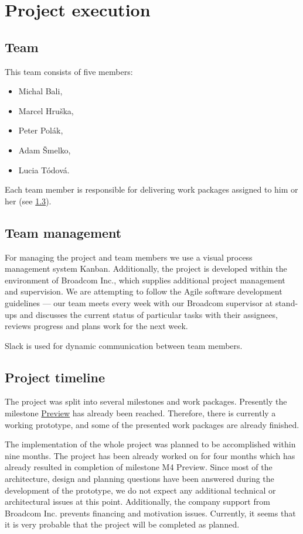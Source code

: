 \chapter{Project execution}

\section{Team}
This team consists of five members:

\begin{itemize}
	\item Michal Bali,
	\item Marcel Hruška,
	\item Peter Polák,
	\item Adam Šmelko,
	\item Lucia Tódová.
\end{itemize}

Each team member is responsible for delivering work packages assigned to him or her (see \cref{timeline}). 

\section{Team management} 

For managing the project and team members we use a visual process management system Kanban. Additionally, the project is developed within the environment of Broadcom Inc., which supplies additional project management and supervision. We are attempting to follow the Agile software development guidelines --- our team meets every week with our Broadcom supervisor at stand-ups and discusses the current status of particular tasks with their assignees, reviews progress and plans work for the next week. 

Slack is used for dynamic communication between team members.

\section{Project timeline}
\label{timeline}
The project was split into several milestones and work packages. Presently the milestone \hyperref[milestone_preview]{Preview} has already been reached. Therefore, there is currently a working prototype, and some of the presented work packages are already finished. 

The implementation of the whole project was planned to be accomplished within nine months. The project has been already worked on for four months which has already resulted in completion of milestone M4 Preview. Since most of the architecture, design and planning questions have been answered during the development of the prototype, we do not expect any additional technical or architectural issues at this point. Additionally, the company support from Broadcom Inc. prevents financing and motivation issues. Currently, it seems that it is very probable that the project will be completed as planned. 

